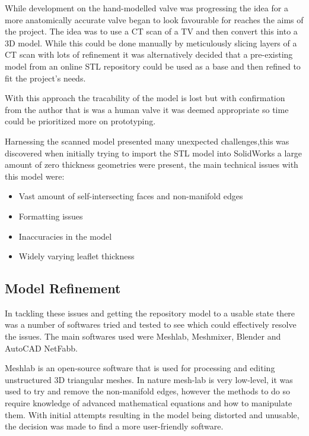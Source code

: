 While development on the hand-modelled valve was progressing the idea for a more anatomically accurate valve began to look favourable for reaches the aims of the project. The idea was to use a \gls{CT} scan of a \gls{TV} and then convert this into a 3D model. While this could be done manually by meticulously slicing layers of a \gls{CT} scan with lots of refinement it was alternatively decided that a pre-existing model from an online STL repository could be used as a base and then refined to fit the project's needs.

With this approach the tracability of the model is lost but with confirmation from the author that is was a human valve it was deemed appropriate so time could be prioritized more on prototyping.

Harnessing the scanned model presented many unexpected challenges,this was discovered when initially trying to import the STL model into SolidWorks a large amount of zero thickness geometries were present, the main technical issues with this model were:
\begin{itemize}
    \item Vast amount of self-intersecting faces and non-manifold edges
    \item Formatting issues
    \item Inaccuracies in the model
    \item Widely varying leaflet thickness
\end{itemize}

\subsection{Model Refinement}
In tackling these issues and getting the repository model to a usable state there was a number of softwares tried and tested to see which could effectively resolve the issues. The main softwares used were Meshlab, Meshmixer, Blender and AutoCAD NetFabb.

Meshlab is an open-source software that is used for processing and editing unstructured 3D triangular meshes. In nature mesh-lab is very low-level,  it was used to try and remove the non-manifold edges, however the methods to do so require knowledge of advanced mathematical equations and how to manipulate them. With initial attempts resulting in the model being distorted and unusable, the decision was made to find a more user-friendly software.

